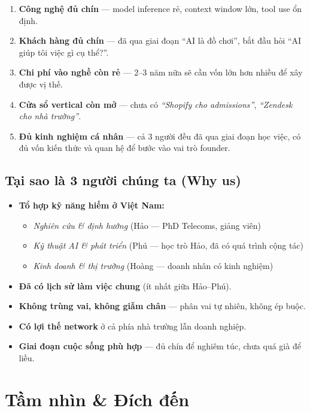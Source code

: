 \documentclass[11pt,a4paper]{article}
\begin{document}
\begin{enumerate}
\item \textbf{Công nghệ đủ chín} — model inference rẻ, context window lớn, tool use ổn định.
\item \textbf{Khách hàng đủ chín} — đã qua giai đoạn ``AI là đồ chơi'', bắt đầu hỏi ``AI giúp tôi việc gì cụ thể?''.
\item \textbf{Chi phí vào nghề còn rẻ} — 2--3 năm nữa sẽ cần vốn lớn hơn nhiều để xây được vị thế.
\item \textbf{Cửa sổ vertical còn mở} — chưa có \textit{``Shopify cho admissions''}, \textit{``Zendesk cho nhà trường''}.
\item \textbf{Đủ kinh nghiệm cá nhân} — cả 3 người đều đã qua giai đoạn học việc, có đủ vốn kiến thức và quan hệ để bước vào vai trò founder.
\end{enumerate}

\subsection{Tại sao là 3 người chúng ta (Why us)}

\begin{itemize}
\item \textbf{Tổ hợp kỹ năng hiếm ở Việt Nam:}
\begin{itemize}
  \item \emph{Nghiên cứu \& định hướng} (Hảo — PhD Telecoms, giảng viên)
  \item \emph{Kỹ thuật AI \& phát triển} (Phú — học trò Hảo, đã có quá trình cộng tác)
  \item \emph{Kinh doanh \& thị trường} (Hoàng — doanh nhân có kinh nghiệm)
\end{itemize}
\item \textbf{Đã có lịch sử làm việc chung} (ít nhất giữa Hảo--Phú).
\item \textbf{Không trùng vai, không giẫm chân} — phân vai tự nhiên, không ép buộc.
\item \textbf{Có lợi thế network} ở cả phía nhà trường lẫn doanh nghiệp.
\item \textbf{Giai đoạn cuộc sống phù hợp} — đủ chín để nghiêm túc, chưa quá già để liều.
\end{itemize}

\clearpage

\section{Tầm nhìn \& Đích đến}
\end{document}
